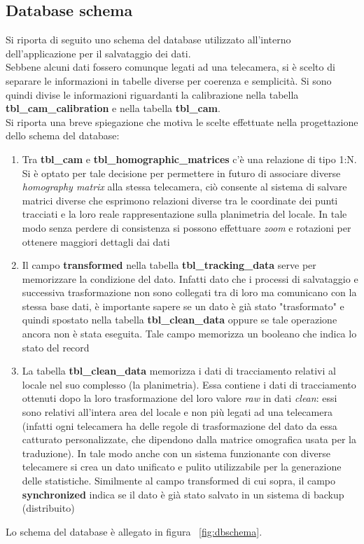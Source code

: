 \documentclass[a4paper,13pt,twoside]{article}
\begin{document}
\subsection{Database schema} \label{sec:dbschema}
Si riporta di seguito uno schema del database utilizzato all'interno dell'applicazione per il salvataggio dei dati. \\
Sebbene alcuni dati fossero comunque legati ad una telecamera, si è scelto di separare le informazioni in tabelle diverse per coerenza e semplicità. Si sono quindi divise le informazioni riguardanti la calibrazione nella tabella \textbf{tbl\_cam\_calibration} e nella tabella \textbf{tbl\_cam}.\\
Si riporta una breve spiegazione che motiva le scelte effettuate nella progettazione dello schema del database:
\begin{enumerate}
	\item Tra \textbf{tbl\_cam} e \textbf{tbl\_homographic\_matrices} c'è una relazione di tipo 1:N. Si è optato per tale decisione per permettere in futuro di associare diverse \textit{homography matrix} alla stessa telecamera, ciò consente al sistema di salvare matrici diverse che esprimono relazioni diverse tra le coordinate dei punti tracciati e la loro reale rappresentazione sulla planimetria del locale. In tale modo senza perdere di consistenza si possono effettuare \textit{zoom} e rotazioni per ottenere maggiori dettagli dai dati
	\item Il campo \textbf{transformed} nella tabella \textbf{tbl\_tracking\_data} serve per memorizzare la condizione del dato. Infatti dato che i processi di salvataggio e successiva trasformazione non sono collegati tra di loro ma comunicano con la stessa base dati, è importante sapere se un dato è già stato "trasformato" e quindi spostato nella tabella \textbf{tbl\_clean\_data} oppure se tale operazione ancora non è stata eseguita. Tale campo memorizza un booleano che indica lo stato del record
	\item La tabella \textbf{tbl\_clean\_data} memorizza i dati di tracciamento relativi al locale nel suo complesso (la planimetria). Essa contiene i dati di tracciamento ottenuti dopo la loro trasformazione del loro valore \textit{raw} in dati \textit{clean}: essi sono relativi all'intera area del locale e non più legati ad una telecamera (infatti ogni telecamera ha delle regole di trasformazione del dato da essa catturato personalizzate, che dipendono dalla matrice omografica usata per la traduzione). In tale modo anche con un sistema funzionante con diverse telecamere si crea un dato unificato e pulito utilizzabile per la generazione delle statistiche. Similmente al campo transformed di cui sopra, il campo \textbf{synchronized} indica se il dato è già stato salvato in un sistema di backup (distribuito)
\end{enumerate}
Lo schema del database è allegato in figura ~\ref{fig:dbschema}.
\end{document}
